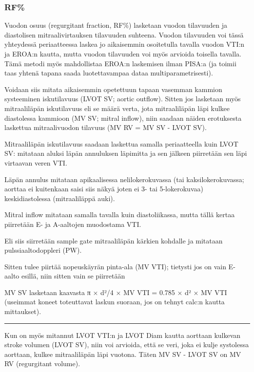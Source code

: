 \documentclass[
]{book}
\begin{document}
\subsubsection{RF\%}\label{rf}

Vuodon osuus (regurgitant fraction, RF\%) lasketaan vuodon tilavuuden ja diastolisen mitraalivirtauksen tilavuuden suhteena. Vuodon tilavuuden voi tässä yhteydessä periaatteessa laskea jo aikaisemmin osoitetulla tavalla vuodon VTI:n ja EROA:n kautta, mutta vuodon tilavuuden voi myös arvioida toisella tavalla. Tämä metodi myös mahdollistaa EROA:n laskemisen ilman PISA:a (ja toimii taas yhtenä tapana saada luotettavampaa dataa multiparametrisesti).

Voidaan siis mitata aikaisemmin opetettuun tapaan vasemman kammion systeeminen iskutilavuus (LVOT SV; aortic outflow). Sitten jos lasketaan myös mitraaliläpän iskutilavuus eli se määrä verta, jota mitraaliläpän läpi kulkee diastolessa kammioon (MV SV; mitral inflow), niin saadaan näiden erotuksesta laskettua mitraalivuodon tilavuus (MV RV = MV SV - LVOT SV).

Mitraaliläpän iskutilavuus saadaan laskettua samalla periaatteella kuin LVOT SV: mitataan aluksi läpän annuluksen läpimitta ja sen jälkeen piirretään sen läpi virtaavan veren VTI.

Läpän annulus mitataan apikaalisessa nelilokerokuvassa (tai kaksilokerokuvassa; aorttaa ei kuitenkaan saisi siis näkyä joten ei 3- tai 5-lokerokuvaa) keskidiastolessa (mitraaliläppä auki).

Mitral inflow mitataan samalla tavalla kuin diastoliikassa, mutta tällä kertaa piirretään E- ja A-aaltojen muodostama VTI.

Eli siis siirretään sample gate mitraaliläpän kärkien kohdalle ja mitataan pulssiaaltodoppleri (PW).

Sitten tulee piirtää nopeuskäyrän pinta-ala (MV VTI); tietysti jos on vain E-aalto esillä, niin sitten vain se piirretään

MV SV lasketaan kaavasta π × d²/4 × MV VTI = 0.785 × d² × MV VTI (useimmat koneet toteuttavat laskun suoraan, jos on tehnyt calc:n kautta mittaukset).

\begin{center}\rule{0.5\linewidth}{0.5pt}\end{center}

Kun on myös mitannut LVOT VTI:n ja LVOT Diam kautta aorttaan kulkevan stroke volumen (LVOT SV), niin voi arvioida, että se veri, joka ei kulje systolessa aorttaan, kulkee mitraaliläpän läpi vuotona. Täten MV SV - LVOT SV on MV RV (regurgitant volume).
\end{document}
